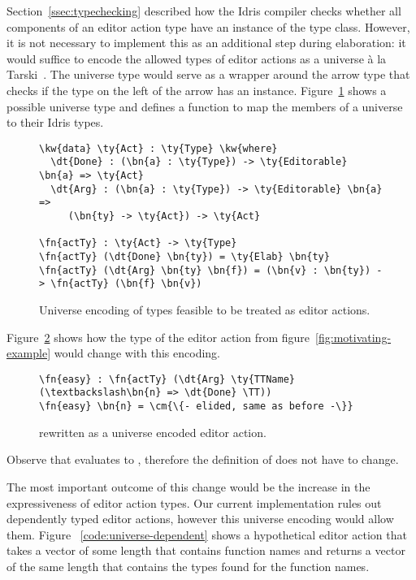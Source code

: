 Section~\ref{ssec:typechecking} described how the Idris compiler
checks whether all components of an editor action type have an
instance of the \Editorable{} type class. However, it is not necessary
to implement this as an additional step during elaboration: it would suffice to
encode the allowed types of editor actions as a universe à la
Tarski~\cite{genericDep}.  The universe type would serve as a wrapper around the
arrow type that checks if the type on the left of the arrow has an
\Editorable{} instance. Figure~\ref{code:universe} shows a possible
universe type and defines a function to map the members of a universe
to their Idris types.

\begin{figure}[H]
\begin{Verbatim}
\kw{data} \ty{Act} : \ty{Type} \kw{where}
  \dt{Done} : (\bn{a} : \ty{Type}) -> \ty{Editorable} \bn{a} => \ty{Act}
  \dt{Arg} : (\bn{a} : \ty{Type}) -> \ty{Editorable} \bn{a} =>
     (\bn{ty} -> \ty{Act}) -> \ty{Act}

\fn{actTy} : \ty{Act} -> \ty{Type}
\fn{actTy} (\dt{Done} \bn{ty}) = \ty{Elab} \bn{ty}
\fn{actTy} (\dt{Arg} \bn{ty} \bn{f}) = (\bn{v} : \bn{ty}) -> \fn{actTy} (\bn{f} \bn{v})
\end{Verbatim}
\caption{Universe encoding of types feasible to be treated as editor actions.}
\label{code:universe}
\end{figure}

Figure~\ref{code:universe-example} shows how the type of the  editor
action from figure~\ref{fig:motivating-example} would change with this encoding.

\begin{figure}[H]
\begin{Verbatim}
\fn{easy} : \fn{actTy} (\dt{Arg} \ty{TTName} (\textbackslash\bn{n} => \dt{Done} \TT))
\fn{easy} \bn{n} = \cm{\{- elided, same as before -\}}
\end{Verbatim}
\caption{ rewritten as a universe encoded editor action.}
\label{code:universe-example}
\end{figure}

Observe that  evaluates
to , therefore the definition of  does
not have to change.

The most important outcome of this change would be the increase in the
expressiveness of editor action types. Our current implementation rules out
dependently typed editor actions, however this universe encoding would allow
them. Figure ~\ref{code:universe-dependent} shows a
hypothetical editor action that takes a vector of some length that contains
function names and returns a vector of the same length that contains the types
found for the function names.

